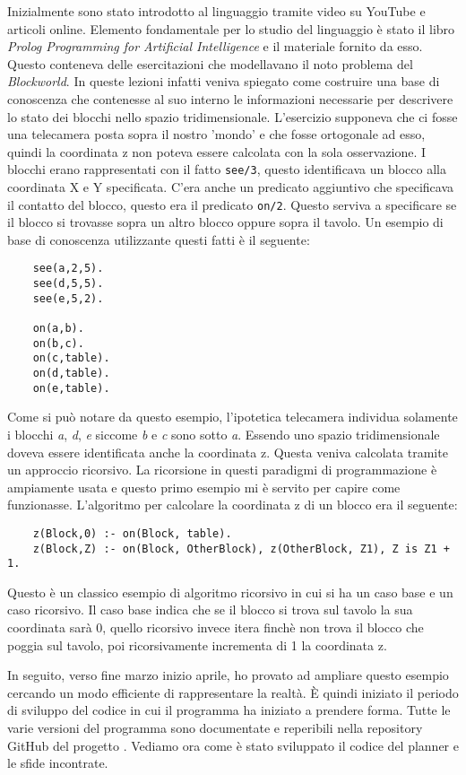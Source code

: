 Inizialmente sono stato introdotto al linguaggio tramite video su YouTube e articoli online. Elemento fondamentale per
lo studio del linguaggio è stato il libro \textit{Prolog Programming for Artificial Intelligence} \cite{bratko2001prolog} e il materiale fornito da esso.
Questo conteneva delle esercitazioni che modellavano il noto problema del \textit{Blockworld}. In queste lezioni infatti veniva spiegato come costruire una base di conoscenza che contenesse al suo interno
le informazioni necessarie per descrivere lo stato dei blocchi nello spazio tridimensionale. L'esercizio supponeva che ci fosse una telecamera posta sopra il nostro 'mondo' e che fosse ortogonale ad esso, quindi la coordinata z non poteva essere calcolata con la sola osservazione.
I blocchi erano rappresentati con il fatto \verb+see/3+, questo identificava un blocco alla coordinata X e Y specificata.
C'era anche un predicato aggiuntivo che specificava il contatto del blocco, questo era il predicato \verb+on/2+. Questo serviva a specificare se il blocco si trovasse sopra un altro blocco oppure sopra il tavolo.
Un esempio di base di conoscenza utilizzante questi fatti è il seguente:
\begin{lstlisting}
    see(a,2,5).
    see(d,5,5).
    see(e,5,2).

    on(a,b).
    on(b,c).
    on(c,table).
    on(d,table).
    on(e,table).
\end{lstlisting}
Come si può notare da questo esempio, l'ipotetica telecamera individua solamente i blocchi \textit{a}, \textit{d}, \textit{e} siccome  \textit{b} e \textit{c} sono sotto \textit{a}.
Essendo uno spazio tridimensionale doveva essere identificata anche la coordinata z. Questa veniva calcolata tramite un approccio ricorsivo. La ricorsione in questi paradigmi di programmazione è ampiamente usata e questo primo esempio mi è servito per capire come funzionasse.
L'algoritmo per calcolare la coordinata z di un blocco era il seguente:
\begin{lstlisting}
    z(Block,0) :- on(Block, table).
    z(Block,Z) :- on(Block, OtherBlock), z(OtherBlock, Z1), Z is Z1 + 1.
\end{lstlisting}
Questo è un classico esempio di algoritmo ricorsivo in cui si ha un caso base e un caso ricorsivo. Il caso base indica che se il blocco si trova sul tavolo la sua coordinata sarà 0, quello ricorsivo invece itera finchè non trova il blocco che poggia sul tavolo, poi ricorsivamente incrementa di 1 la coordinata z.

In seguito, verso fine marzo inizio aprile, ho provato ad ampliare questo esempio cercando un modo efficiente di rappresentare la realtà. È quindi iniziato il periodo di sviluppo del codice in cui il programma ha iniziato a prendere forma. Tutte le varie versioni del programma sono documentate e reperibili nella repository GitHub del progetto \cite{gitrepo}.
Vediamo ora come è stato sviluppato il codice del planner e le sfide incontrate.
